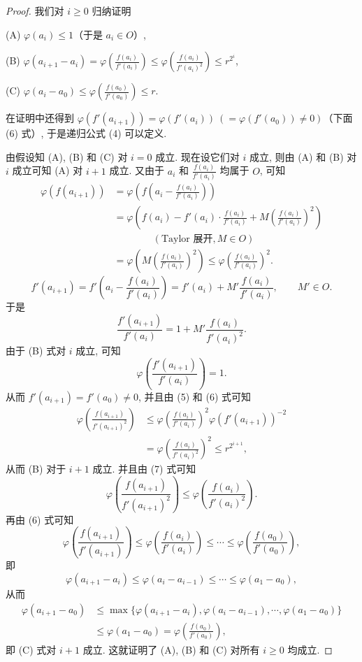 \begin{proof}
我们对 $i\geqslant 0$ 归纳证明

(A) $\varphi(a_i)\leqslant 1$（于是 $a_i\in O$）,

(B) $\varphi(a_{i+1}-a_i)=\varphi\left(\frac{f(a_i)}{f'(a_i)}\right)\leqslant\varphi\left(\frac{f(a_i)}{f'(a_i)^2}\right)\leqslant r^{2^i}$,

(C) $\varphi(a_i-a_0)\leqslant\varphi\left(\frac{f(a_0)}{f'(a_0)}\right)\leqslant r$.

在证明中还得到 $\varphi(f'(a_{i+1}))=\varphi(f'(a_i))\ (=\varphi(f'(a_0))\neq 0)$（下面 (6) 式）, 于是递归公式 (4) 可以定义.

由假设知 (A), (B) 和 (C) 对 $i=0$ 成立. 现在设它们对 $i$ 成立, 则由 (A) 和 (B) 对 $i$ 成立可知 (A) 对 $i+1$ 成立. 又由于 $a_i$ 和 $\frac{f(a_i)}{f'(a_i)}$ 均属于 $O$, 可知
\begin{align}
  \varphi(f(a_{i+1}))&=\varphi\left(f\left(a_i-\frac{f(a_i)}{f'(a_i)}\right)\right)\nonumber\\
  &=\varphi\left(f(a_i)-f'(a_i)\cdot\frac{f(a_i)}{f'(a_i)}+M\left(\frac{f(a_i)}{f'(a_i)}\right)^2\right)\nonumber\\
  &\qquad\qquad(\text{Taylor 展开}, M\in O)\nonumber\\
  &=\varphi\left(M\left(\frac{f(a_i)}{f'(a_i)}\right)^2\right)
  \leqslant\varphi\left(\frac{f(a_i)}{f'(a_i)}\right)^2.\tag{5}
\end{align}
\[
  f'(a_{i+1})=f'\left(a_i-\frac{f(a_i)}{f'(a_i)}\right)
  =f'(a_i)+M'\frac{f(a_i)}{f'(a_i)},\qquad M'\in O.
\]
于是
\[
  \frac{f'(a_{i+1})}{f'(a_i)}=1+M'\frac{f(a_i)}{f'(a_i)^2}.
\]
由于 (B) 式对 $i$ 成立, 可知
\begin{equation}\tag{6}
  \varphi\left(\frac{f'(a_{i+1})}{f'(a_i)}\right)=1.
\end{equation}
从而 $f'(a_{i+1})=f'(a_0)\neq 0$, 并且由 (5) 和 (6) 式可知
\begin{align}
  \varphi\left(\frac{f(a_{i+1})}{f'(a_{i+1})^2}\right)
  &\leqslant\varphi\left(\frac{f(a_i)}{f'(a_i)}\right)^2\varphi(f'(a_{i+1}))^{-2}\nonumber\\
  &=\varphi\left(\frac{f(a_i)}{f'(a_i)^2}\right)^2\leqslant r^{2^{i+1}},\tag{7}
\end{align}
从而 (B) 对于 $i+1$ 成立. 并且由 (7) 式可知
\[
  \varphi\left(\frac{f(a_{i+1})}{f'(a_{i+1})^2}\right)\leqslant\varphi\left(\frac{f(a_i)}{f'(a_i)^2}\right).
\]
再由 (6) 式可知
\[
  \varphi\left(\frac{f(a_{i+1})}{f'(a_{i+1})}\right)\leqslant\varphi\left(\frac{f(a_i)}{f'(a_i)}\right)\leqslant\cdots\leqslant\varphi\left(\frac{f(a_0)}{f'(a_0)}\right),
\]
即
\[
  \varphi(a_{i+1}-a_i)\leqslant\varphi(a_i-a_{i-1})\leqslant\cdots\leqslant\varphi(a_1-a_0),
\]
从而
\begin{align*}
  \varphi(a_{i+1}-a_0)&\leqslant\max\{\varphi(a_{i+1}-a_i),\varphi(a_i-a_{i-1}),\cdots,\varphi(a_1-a_0)\}\\
  &\leqslant\varphi(a_1-a_0)=\varphi\left(\frac{f(a_0)}{f'(a_0)}\right),
\end{align*}
即 (C) 式对 $i+1$ 成立. 这就证明了 (A), (B) 和 (C) 对所有 $i\geqslant 0$ 均成立.


\end{proof}
